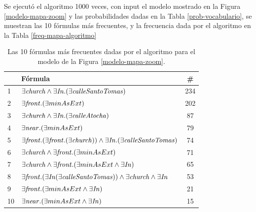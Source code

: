 Se ejecut\'o el algoritmo 1000 veces, con input el modelo mostrado en la Figura \ref{modelo-mapa-zoom} y las probabilidades dadas en la Tabla \ref{prob-vocabulario}, se muestran las 10 f\'ormulas m\'as frecuentes, y la frecuencia dada por el algoritmo en la Tabla \ref{freq-mapa-algoritmo}

\begin{table}[H]
\begin{center}
\begin{tabular}{|l|l|c|}
\hline
&F\'ormula			      &  \# \\ \hline \hline

1 & $\exists \mathit{church} \land \exists \mathit{In} .(\exists \mathit{calleSantoTomas}) $&234 \\ \hline

2 & $\exists \mathit{front} . (\exists minAsExt)$&202 \\ \hline

3& $\exists \mathit{church} \land \exists \mathit{In} .(\exists \mathit{calleAtocha})$&87 \\ \hline

4& $\exists \mathit{near} .(\exists minAsExt)$&79 \\ \hline

5& $\exists \mathit{front} .(\exists \mathit{front} .(\exists \mathit{church})) \land \exists \mathit{In} .(\exists \mathit{calleSantoTomas})$&74 \\ \hline

6& $\exists \mathit{church} \land \exists \mathit{front} .(\exists minAsExt)$&71 \\ \hline

7& $\exists \mathit{church} \land \exists \mathit{front} .(\exists minAsExt \land \exists \mathit{In})$&65 \\ \hline

8& $\exists \mathit{front} .(\exists \mathit{In} (\exists \mathit{calleSantoTomas})) \land \exists \mathit{church} \land \exists \mathit{In}$&53 \\ \hline

9& $\exists \mathit{front} .(\exists minAsExt \land \exists \mathit{In} )$&21 \\ \hline

10&$\exists \mathit{near} .(\exists minAsExt \land \exists \mathit{In} )$&15 \\

\hline
\end{tabular}

\caption{Las 10 f\'ormulas m\'as frecuentes dadas por el algoritmo para el modelo de la Figura \protect\ref{modelo-mapa-zoom}.}\label{formulas-mapa-zoom}
\end{center}
\end{table}

